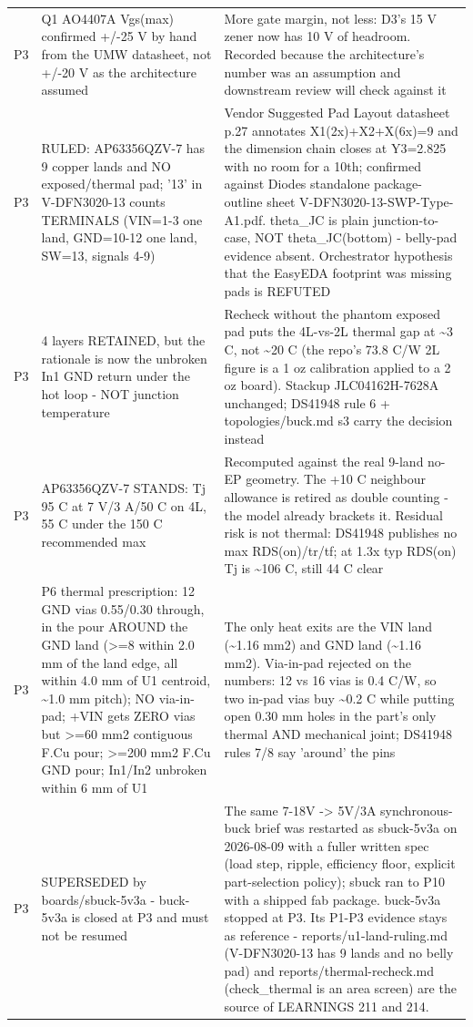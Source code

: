 \documentclass[11pt,a4paper]{article}
\begin{document}
{\begin{longtable}{lp{5.2cm}p{7.2cm}}
P3 & Q1 AO4407A Vgs(max) confirmed +/-25 V by hand from the UMW datasheet, not +/-20 V as the architecture assumed & More gate margin, not less: D3's 15 V zener now has 10 V of headroom. Recorded because the architecture's number was an assumption and downstream review will check against it \\
P3 & RULED: AP63356QZV-7 has 9 copper lands and NO exposed/thermal pad; '13' in V-DFN3020-13 counts TERMINALS (VIN=1-3 one land, GND=10-12 one land, SW=13, signals 4-9) & Vendor Suggested Pad Layout datasheet p.27 annotates X1(2x)+X2+X(6x)=9 and the dimension chain closes at Y3=2.825 with no room for a 10th; confirmed against Diodes standalone package-outline sheet V-DFN3020-13-SWP-Type-A1.pdf. theta\_JC is plain junction-to-case, NOT theta\_JC(bottom) - belly-pad evidence absent. Orchestrator hypothesis that the EasyEDA footprint was missing pads is REFUTED \\
P3 & 4 layers RETAINED, but the rationale is now the unbroken In1 GND return under the hot loop - NOT junction temperature & Recheck without the phantom exposed pad puts the 4L-vs-2L thermal gap at \textasciitilde{}3 C, not \textasciitilde{}20 C (the repo's 73.8 C/W 2L figure is a 1 oz calibration applied to a 2 oz board). Stackup JLC04162H-7628A unchanged; DS41948 rule 6 + topologies/buck.md s3 carry the decision instead \\
P3 & AP63356QZV-7 STANDS: Tj 95 C at 7 V/3 A/50 C on 4L, 55 C under the 150 C recommended max & Recomputed against the real 9-land no-EP geometry. The +10 C neighbour allowance is retired as double counting - the model already brackets it. Residual risk is not thermal: DS41948 publishes no max RDS(on)/tr/tf; at 1.3x typ RDS(on) Tj is \textasciitilde{}106 C, still 44 C clear \\
P3 & P6 thermal prescription: 12 GND vias 0.55/0.30 through, in the pour AROUND the GND land (\textgreater{}=8 within 2.0 mm of the land edge, all within 4.0 mm of U1 centroid, \textasciitilde{}1.0 mm pitch); NO via-in-pad; +VIN gets ZERO vias but \textgreater{}=60 mm2 contiguous F.Cu pour; \textgreater{}=200 mm2 F.Cu GND pour; In1/In2 unbroken within 6 mm of U1 & The only heat exits are the VIN land (\textasciitilde{}1.16 mm2) and GND land (\textasciitilde{}1.16 mm2). Via-in-pad rejected on the numbers: 12 vs 16 vias is 0.4 C/W, so two in-pad vias buy \textasciitilde{}0.2 C while putting open 0.30 mm holes in the part's only thermal AND mechanical joint; DS41948 rules 7/8 say 'around' the pins \\
P3 & SUPERSEDED by boards/sbuck-5v3a - buck-5v3a is closed at P3 and must not be resumed & The same 7-18V -\textgreater{} 5V/3A synchronous-buck brief was restarted as sbuck-5v3a on 2026-08-09 with a fuller written spec (load step, ripple, efficiency floor, explicit part-selection policy); sbuck ran to P10 with a shipped fab package. buck-5v3a stopped at P3. Its P1-P3 evidence stays as reference - reports/u1-land-ruling.md (V-DFN3020-13 has 9 lands and no belly pad) and reports/thermal-recheck.md (check\_thermal is an area screen) are the source of LEARNINGS 211 and 214. \\
\bottomrule
\end{longtable}
}
\end{document}
